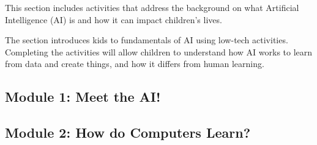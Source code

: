 \documentclass{article}
\begin{document}
This section includes activities that address the background on what Artificial Intelligence (AI) is and how it can impact children’s lives. 

The section introduces kids to fundamentals of AI using low-tech activities. Completing the activities will allow children to understand how AI works to learn from data and create things, and how it differs from human learning. 
\vspace*{\fill}
  
\newpage
\subsection*{\centering Module 1: Meet the AI!}
%


\newpage
\subsection*{\centering Module 2: How do Computers Learn?}

%

\newpage
{}
\BgThispage
\BgThispage
\vspace*{\fill}
\end{document}
